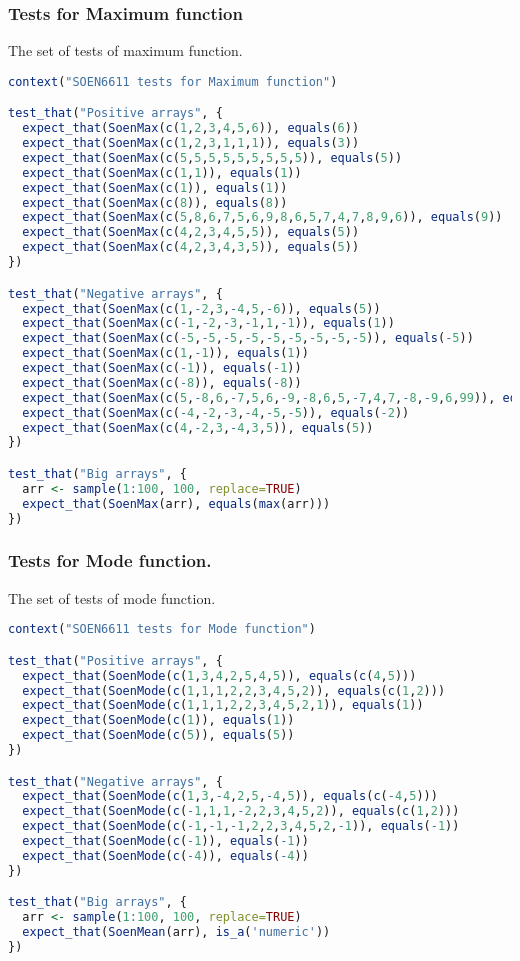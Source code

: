 \documentclass[12pt]{article}
\begin{document}
\subsubsection{Tests for Maximum function}
The set of tests of maximum function.
\begin{lstlisting}[language=R]
context("SOEN6611 tests for Maximum function")

test_that("Positive arrays", {
  expect_that(SoenMax(c(1,2,3,4,5,6)), equals(6))
  expect_that(SoenMax(c(1,2,3,1,1,1)), equals(3))
  expect_that(SoenMax(c(5,5,5,5,5,5,5,5,5)), equals(5))
  expect_that(SoenMax(c(1,1)), equals(1))
  expect_that(SoenMax(c(1)), equals(1))
  expect_that(SoenMax(c(8)), equals(8))
  expect_that(SoenMax(c(5,8,6,7,5,6,9,8,6,5,7,4,7,8,9,6)), equals(9))
  expect_that(SoenMax(c(4,2,3,4,5,5)), equals(5))
  expect_that(SoenMax(c(4,2,3,4,3,5)), equals(5))
})

test_that("Negative arrays", {
  expect_that(SoenMax(c(1,-2,3,-4,5,-6)), equals(5))
  expect_that(SoenMax(c(-1,-2,-3,-1,1,-1)), equals(1))
  expect_that(SoenMax(c(-5,-5,-5,-5,-5,-5,-5,-5,-5)), equals(-5))
  expect_that(SoenMax(c(1,-1)), equals(1))
  expect_that(SoenMax(c(-1)), equals(-1))
  expect_that(SoenMax(c(-8)), equals(-8))
  expect_that(SoenMax(c(5,-8,6,-7,5,6,-9,-8,6,5,-7,4,7,-8,-9,6,99)), equals(99))
  expect_that(SoenMax(c(-4,-2,-3,-4,-5,-5)), equals(-2))
  expect_that(SoenMax(c(4,-2,3,-4,3,5)), equals(5))
})

test_that("Big arrays", {
  arr <- sample(1:100, 100, replace=TRUE)
  expect_that(SoenMax(arr), equals(max(arr)))
})
\end{lstlisting}
\subsubsection{Tests for Mode function.}
The set of tests of mode function.
\begin{lstlisting}[language=R]
context("SOEN6611 tests for Mode function")

test_that("Positive arrays", {
  expect_that(SoenMode(c(1,3,4,2,5,4,5)), equals(c(4,5)))
  expect_that(SoenMode(c(1,1,1,2,2,3,4,5,2)), equals(c(1,2)))
  expect_that(SoenMode(c(1,1,1,2,2,3,4,5,2,1)), equals(1))
  expect_that(SoenMode(c(1)), equals(1))
  expect_that(SoenMode(c(5)), equals(5))
})

test_that("Negative arrays", {
  expect_that(SoenMode(c(1,3,-4,2,5,-4,5)), equals(c(-4,5)))
  expect_that(SoenMode(c(-1,1,1,-2,2,3,4,5,2)), equals(c(1,2)))
  expect_that(SoenMode(c(-1,-1,-1,2,2,3,4,5,2,-1)), equals(-1))
  expect_that(SoenMode(c(-1)), equals(-1))
  expect_that(SoenMode(c(-4)), equals(-4))
})

test_that("Big arrays", {
  arr <- sample(1:100, 100, replace=TRUE)
  expect_that(SoenMean(arr), is_a('numeric'))
})
\end{lstlisting}
\end{document}
